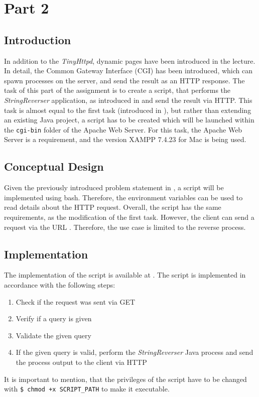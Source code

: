 \section{Part 2}\label{sec:02_part2}

\subsection{Introduction}\label{subsec:02_part2_intro}
In addition to the \textit{TinyHttpd}, dynamic pages have been introduced in the lecture. In detail, the Common Gateway Interface (CGI) has been introduced, which can spawn processes on the server, and send the result as an HTTP response.
The task of this part of the assignment is to create a script, that performs the \textit{StringReverser} application, as introduced in  and send the result via HTTP. This task is almost equal to the first task (introduced in ), but rather than extending an existing Java project, a script has to be created which will be launched within the \texttt{cgi-bin} folder of the Apache Web Server.
For this task, the Apache Web Server is a requirement, and the version XAMPP 7.4.23 for Mac is being used. 

\subsection{Conceptual Design}\label{subsec:02_part2_design}
Given the previously introduced problem statement in , a script will be implemented using bash. Therefore, the environment variables can be used to read details about the HTTP request.
Overall, the script has the same requirements, as the modification of the first task. However, the client can send a request via the URL . Therefore, the use case is limited to the reverse process.

\subsection{Implementation}\label{subsec:02_part2_impl}
The implementation of the script is available at .
The script is implemented in accordance with the following steps:
\begin{enumerate}
\item Check if the request was sent via GET
\item Verify if a query is given
\item Validate the given query
\item If the given query is valid, perform the \textit{StringReverser} Java process and send the process output to the client via HTTP
\end{enumerate}
It is important to mention, that the privileges of the script have to be changed with \texttt{\$ chmod +x SCRIPT\_PATH} to make it executable.


